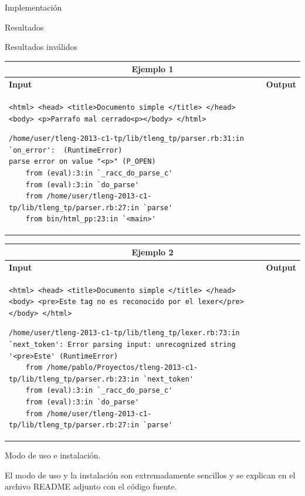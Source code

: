 \documentclass[a4paper,8pt]{article}
\begin{document}
\begin{section}{Implementación}
\begin{subsection}{Resultados}
\begin{subsubsection}{Resultados inválidos}
\begin{tabular}{|p{6.5cm}|p{6.5cm}|}
\hline 
\multicolumn{2}{|c|}{Ejemplo 1}\\
\hline 
\textbf{Input}&\textbf{Output}\\
\hline 
\footnotesize{\begin{verbatim}
<html> <head> <title>Documento simple </title> </head><body> <p>Parrafo mal cerrado<p></body> </html>
\end{verbatim}}

\bigskip
\footnotesize{\begin{verbatim}
/home/user/tleng-2013-c1-tp/lib/tleng_tp/parser.rb:31:in `on_error':  (RuntimeError)
parse error on value "<p>" (P_OPEN)
	from (eval):3:in `_racc_do_parse_c'
	from (eval):3:in `do_parse'
	from /home/user/tleng-2013-c1-tp/lib/tleng_tp/parser.rb:27:in `parse'
	from bin/html_pp:23:in `<main>'
\end{verbatim}}\\
\hline

\end{tabular}


\begin{tabular}{|p{6.5cm}|p{6.5cm}|}
\hline 
\multicolumn{2}{|c|}{Ejemplo 2}\\
\hline 
\textbf{Input}&\textbf{Output}\\
\hline 
\footnotesize{\begin{verbatim}
<html> <head> <title>Documento simple </title> </head><body> <pre>Este tag no es reconocido por el lexer</pre> </body> </html>
\end{verbatim}}

\bigskip
\footnotesize{\begin{verbatim}
/home/user/tleng-2013-c1-tp/lib/tleng_tp/lexer.rb:73:in `next_token': Error parsing input: unrecognized string '<pre>Este' (RuntimeError)
	from /home/pablo/Proyectos/tleng-2013-c1-tp/lib/tleng_tp/parser.rb:23:in `next_token'
	from (eval):3:in `_racc_do_parse_c'
	from (eval):3:in `do_parse'
	from /home/user/tleng-2013-c1-tp/lib/tleng_tp/parser.rb:27:in `parse'
\end{verbatim}}\\
\hline

\end{tabular}

\end{subsubsection}
\end{subsection}


\begin{subsection}{Modo de uso e instalación.}

El modo de uso y la instalación son extremadamente sencillos y se explican en el archivo README adjunto con el código fuente.

\end{subsection}
\end{section}
\end{document}
